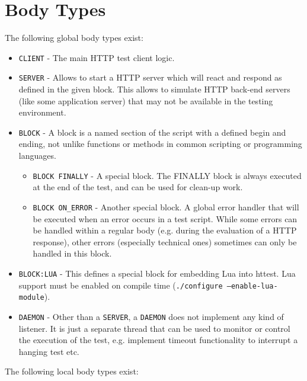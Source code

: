 \chapter{Body Types}
\label{chap:bodytypes}

The following global body types exist:

\begin{itemize}
\item \texttt{CLIENT} - The main HTTP test client logic.
 
\item \texttt{SERVER} - Allows to start a HTTP server which will react and respond as defined in the 
 given block. This allows to simulate HTTP back-end servers (like some application server)
 that may not be available in the testing environment.
 
\item \texttt{BLOCK} - A block is a named section of the script with a defined begin and ending, not 
 unlike functions or methods in common scripting or programming languages. 

  \begin{itemize}
    \item \texttt{BLOCK FINALLY} - A special block. The FINALLY block is always executed at the end of
    the test, and can be used for clean-up work.
    \item \texttt{BLOCK ON\_ERROR} - Another special block. A global error handler that will be executed 
    when an error occurs in a test script. While some errors can be handled within a regular body (e.g. during 
    the evaluation of a HTTP response), other errors (especially technical ones) sometimes can only be 
    handled in this block.
  \end{itemize}
  
\item \texttt{BLOCK:LUA} - This defines a special block for embedding Lua into httest. Lua support must
be enabled on compile time (\texttt{./configure --enable-lua-module}). 
 
\item \texttt{DAEMON} - Other than a \texttt{SERVER}, a \texttt{DAEMON} does not implement any kind of listener. It is just 
a separate thread that can be used to monitor or control the execution of the test, e.g. implement timeout 
functionality to interrupt a hanging test etc.

\end{itemize}


The following local body types exist:

